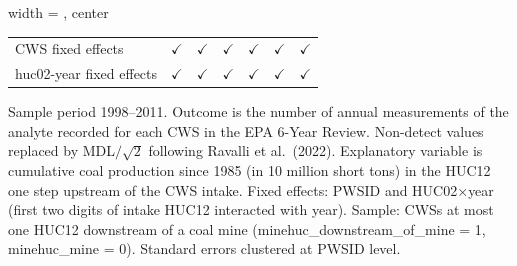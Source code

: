 \begin{table}[htbp]
\begin{adjustbox}{width = \textwidth, center}
\begin{tabular}{lcccccc}
          \\
         
         CWS fixed effects                   & $\checkmark$      & $\checkmark$       & $\checkmark$      & $\checkmark$           & $\checkmark$            & $\checkmark$\\   
         huc02-year fixed effects            & $\checkmark$      & $\checkmark$       & $\checkmark$      & $\checkmark$           & $\checkmark$            & $\checkmark$\\   
         
         \bottomrule
         
      \end{tabular}
      
      
      
   \end{adjustbox}
      {\tiny\linespread{1}\selectfont \par \raggedright 
   Sample period 1998--2011. Outcome is the number of annual measurements of the analyte recorded for each CWS in the EPA 6-Year Review. Non-detect values replaced by MDL$/\sqrt{2}$ following Ravalli et al.~(2022). Explanatory variable is cumulative coal production since 1985 (in 10 million short tons) in the HUC12 one step upstream of the CWS intake. Fixed effects: PWSID and HUC02$\times$year (first two digits of intake HUC12 interacted with year). Sample: CWSs at most one HUC12 downstream of a coal mine (minehuc\_downstream\_of\_mine = 1, minehuc\_mine = 0). Standard errors clustered at PWSID level.}
   
\end{table}


